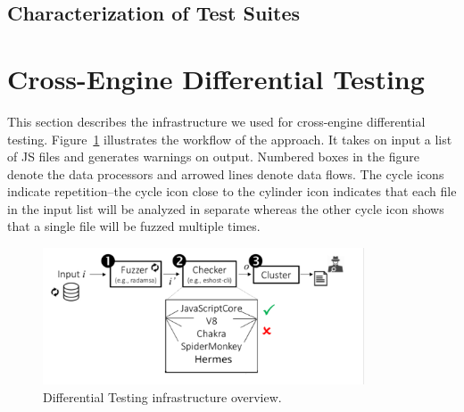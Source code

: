\documentclass[smallextended]{svjour3}
\begin{document}






\subsection{Characterization of Test Suites}


\section{Cross-Engine Differential Testing}
\label{sec:design}

This section describes the infrastructure we used for cross-engine
differential testing. Figure~\ref{fig:workflow} illustrates the
workflow of the approach. It takes on input a list of JS files and
generates warnings on output. Numbered boxes in the figure denote the
data processors and arrowed lines denote data flows. The cycle icons
indicate repetition--the cycle icon close to the cylinder icon
indicates that each file in the input list will be analyzed in
separate whereas the other cycle icon shows that a single file will be
fuzzed multiple times.

\begin{figure}[t]
  \centering
  \includegraphics[trim=0 0 0 0,clip,width=0.85\textwidth]{diff-testing-runtimes}
  \caption{\label{fig:workflow}Differential Testing infrastructure
    overview.}
\end{figure}
\end{document}
